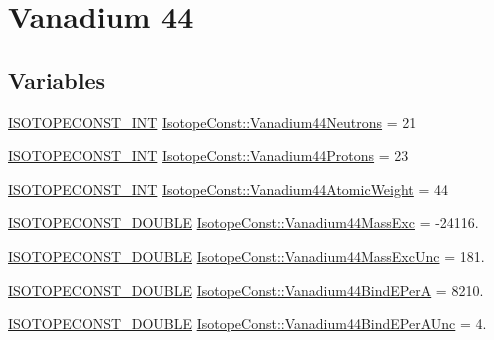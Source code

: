 \hypertarget{group___isotope_const-_vanadium-_v44}{}\section{Vanadium 44}
\label{group___isotope_const-_vanadium-_v44}
\subsection*{Variables}
\begin{DoxyCompactItemize}
\item 
\mbox{\hyperlink{group___isotope_const-_macros_ga5f18360b3e99483a35c32d789e62621c}{I\+S\+O\+T\+O\+P\+E\+C\+O\+N\+S\+T\+\_\+\+I\+NT}} \mbox{\hyperlink{group___isotope_const-_vanadium-_v44_ga36b58364034ebea6ff2f3757994509ac}{Isotope\+Const\+::\+Vanadium44\+Neutrons}} = 21
\item 
\mbox{\hyperlink{group___isotope_const-_macros_ga5f18360b3e99483a35c32d789e62621c}{I\+S\+O\+T\+O\+P\+E\+C\+O\+N\+S\+T\+\_\+\+I\+NT}} \mbox{\hyperlink{group___isotope_const-_vanadium-_v44_ga2bb7c208d83ef95143d9f15ab346d200}{Isotope\+Const\+::\+Vanadium44\+Protons}} = 23
\item 
\mbox{\hyperlink{group___isotope_const-_macros_ga5f18360b3e99483a35c32d789e62621c}{I\+S\+O\+T\+O\+P\+E\+C\+O\+N\+S\+T\+\_\+\+I\+NT}} \mbox{\hyperlink{group___isotope_const-_vanadium-_v44_ga697b5b9fc43e3a2f0d2c787ecf64255e}{Isotope\+Const\+::\+Vanadium44\+Atomic\+Weight}} = 44
\item 
\mbox{\hyperlink{group___isotope_const-_macros_ga8f45a7272ce02c0b4c65c44636ed719a}{I\+S\+O\+T\+O\+P\+E\+C\+O\+N\+S\+T\+\_\+\+D\+O\+U\+B\+LE}} \mbox{\hyperlink{group___isotope_const-_vanadium-_v44_gac5821fce65ca970939cc465afcdabe8c}{Isotope\+Const\+::\+Vanadium44\+Mass\+Exc}} = -\/24116.
\item 
\mbox{\hyperlink{group___isotope_const-_macros_ga8f45a7272ce02c0b4c65c44636ed719a}{I\+S\+O\+T\+O\+P\+E\+C\+O\+N\+S\+T\+\_\+\+D\+O\+U\+B\+LE}} \mbox{\hyperlink{group___isotope_const-_vanadium-_v44_ga2fbf6494d91aa984a5fd89402f83a4b6}{Isotope\+Const\+::\+Vanadium44\+Mass\+Exc\+Unc}} = 181.
\item 
\mbox{\hyperlink{group___isotope_const-_macros_ga8f45a7272ce02c0b4c65c44636ed719a}{I\+S\+O\+T\+O\+P\+E\+C\+O\+N\+S\+T\+\_\+\+D\+O\+U\+B\+LE}} \mbox{\hyperlink{group___isotope_const-_vanadium-_v44_ga2ffd73d9863d8e00a72fc520fcd9aaf6}{Isotope\+Const\+::\+Vanadium44\+Bind\+E\+PerA}} = 8210.
\item 
\mbox{\hyperlink{group___isotope_const-_macros_ga8f45a7272ce02c0b4c65c44636ed719a}{I\+S\+O\+T\+O\+P\+E\+C\+O\+N\+S\+T\+\_\+\+D\+O\+U\+B\+LE}} \mbox{\hyperlink{group___isotope_const-_vanadium-_v44_ga2a7f44ed7fed34c188bbd0e17d5c0b08}{Isotope\+Const\+::\+Vanadium44\+Bind\+E\+Per\+A\+Unc}} = 4.

\end{DoxyCompactItemize}
